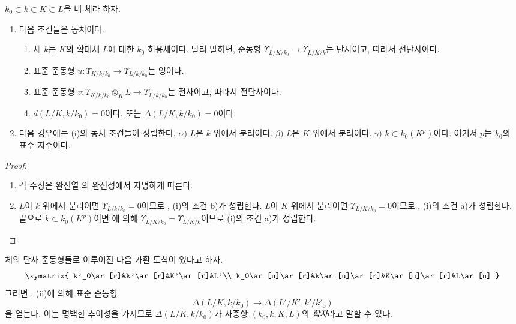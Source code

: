 \begin{proposition}[21.6.2]
\label{0.21.6.2-ko}
$k_0\subset k\subset K\subset L$을 네 체라 하자.
\begin{enumerate}
  \item[\rm (i)] 다음 조건들은 동치이다.
  \begin{enumerate}
    \item[\rm a)] 체 $k$는 $K$의 확대체 $L$에 대한 $k_0$-허용체이다.
    달리 말하면, 준동형
    $\Upsilon_{L/K/k_0}\to\Upsilon_{L/K/k}$는 단사이고, 따라서
    전단사이다.
    \item[\rm b)] 표준 준동형
    $u:\Upsilon_{K/k/k_0}\to\Upsilon_{L/k/k_0}$는 영이다.
    \item[\rm c)] 표준 준동형
    $v:\Upsilon_{K/k/k_0}\otimes_KL\to\Upsilon_{L/k/k_0}$는 전사이고,
    따라서 전단사이다.
    \item[\rm d)] $d(L/K,k/k_0)=0$이다. 또는
    $\Delta(L/K,k/k_0)=0$이다.
  \end{enumerate}
  \item[\rm (ii)] 다음 경우에는 (i)의 동치 조건들이 성립한다.
  $\alpha)$ $L$은 $k$ 위에서 분리이다.
  $\beta)$ $L$은 $K$ 위에서 분리이다.
  $\gamma)$ $k\subset k_0(K^p)$이다. 여기서 $p$는 $k_0$의 표수
  지수이다.
\end{enumerate}
\end{proposition}

\begin{proof}
\begin{enumerate}
  \item[(i)] 각 주장은 완전열 의 완전성에서
  자명하게 따른다.
  \item[(ii)] $L$이 $k$ 위에서 분리이면
  $\Upsilon_{L/k/k_0}=0$이므로 , (i)의 조건 b)가
  성립한다. $L$이 $K$ 위에서 분리이면
  $\Upsilon_{L/K/k_0}=0$이므로 , (i)의 조건 a)가
  성립한다. 끝으로 $k\subset k_0(K^p)$이면
  에 의해
  $\Upsilon_{L/K/k_0}=\Upsilon_{L/K/k}$이므로 (i)의 조건 a)가 성립한다.
\end{enumerate}
\end{proof}

\begin{env}[21.6.3]
\label{0.21.6.3-ko}
체의 단사 준동형들로 이루어진 다음 가환 도식이 있다고 하자.
\[
\xymatrix{
 k'_0\ar[r]&k'\ar[r]&K'\ar[r]&L'\\
 k_0\ar[u]\ar[r]&k\ar[u]\ar[r]&K\ar[u]\ar[r]&L\ar[u]
}
\]
그러면 , (ii)에 의해 표준 준동형
\begin{equation}
\tag{21.6.3.1}
\label{0.21.6.3.1-ko}
\Delta(L/K,k/k_0)\longrightarrow\Delta(L'/K',k'/k'_0)
\end{equation}
을 얻는다. 이는 명백한 추이성을 가지므로 $\Delta(L/K,k/k_0)$가
사중항 $(k_0,k,K,L)$의 \emph{함자}라고 말할 수 있다.
\end{env}


